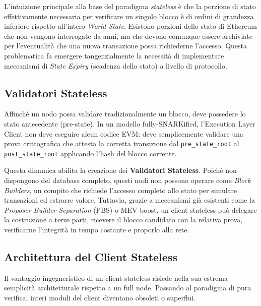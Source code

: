 \documentclass[12pt,a4paper,openright,twoside]{report}
\begin{document}
L'intuizione principale alla base del paradigma \textit{stateless} è che la porzione di stato effettivamente necessaria per verificare un singolo blocco è di ordini di grandezza inferiore rispetto all'intero \textit{World State}. Esistono porzioni dello stato di Ethereum che non vengono interrogate da anni, ma che devono comunque essere archiviate per l'eventualità che una nuova transazione possa richiederne l'accesso. Questa problematica fa emergere tangenzialmente la necessità di implementare meccanismi di \textit{State Expiry} (scadenza dello stato) a livello di protocollo.

\subsection{Validatori Stateless}
Affinché un nodo possa validare tradizionalmente un blocco, deve possedere lo stato antecedente (pre-state). In un modello fully-SNARKified, l'Execution Layer Client non deve eseguire alcun codice EVM: deve semplicemente validare una prova crittografica che attesta la corretta transizione dal \texttt{pre\_state\_root} al \texttt{post\_state\_root} applicando l'hash del blocco corrente.

Questa dinamica abilita la creazione dei \textbf{Validatori Stateless}. Poiché non dispongono del database completo, questi nodi non possono operare come \textit{Block Builders}, un compito che richiede l'accesso completo allo stato per simulare transazioni ed estrarre valore. Tuttavia, grazie a meccanismi già esistenti come la \textit{Proposer-Builder Separation} (PBS) o MEV-boost, un client stateless può delegare la costruzione a terze parti, ricevere il blocco candidato con la relativa prova, verificarne l'integrità in tempo costante e proporlo alla rete.

\subsection{Architettura del Client Stateless}
Il vantaggio ingegneristico di un client stateless risiede nella sua estrema semplicità architetturale rispetto a un full node. Passando al paradigma di pura verifica, interi moduli del client diventano obsoleti o superflui.
\end{document}
